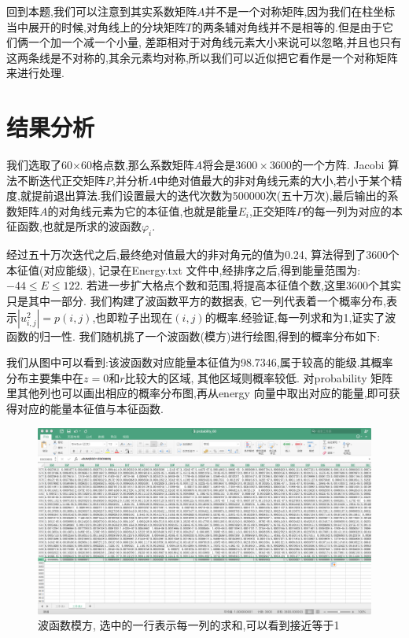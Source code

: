  回到本题,我们可以注意到其实系数矩阵$A$并不是一个对称矩阵,因为我们在柱坐标当中展开的时候,对角线上的分块矩阵$T$的两条辅对角线并不是相等的.但是由于它们俩一个加一个减一个小量, 差距相对于对角线元素大小来说可以忽略,并且也只有这两条线是不对称的,其余元素均对称,所以我们可以近似把它看作是一个对称矩阵来进行处理.
 
 \section{结果分析}
 
 我们选取了60$\times$60格点数,那么系数矩阵$A$将会是$3600\times 3600$的一个方阵. Jacobi 算法不断迭代正交矩阵$P$,并分析$A$中绝对值最大的非对角线元素的大小,若小于某个精度,就提前退出算法.我们设置最大的迭代次数为500000次(五十万次),最后输出的系数矩阵$A$的对角线元素为它的本征值,也就是能量$E_i$,正交矩阵$P$的每一列为对应的本征函数,也就是所求的波函数$\varphi_i$.
 
 经过五十万次迭代之后,最终绝对值最大的非对角元的值为0.24, 算法得到了3600个本征值(对应能级), 记录在Energy.txt 文件中,经排序之后,得到能量范围为:
$-44\leq E\leq 122$. 若进一步扩大格点个数和范围,将提高本征值个数,这里3600个其实只是其中一部分. 我们构建了波函数平方的数据表, 它一列代表着一个概率分布,表示$|u_{i,j}^2|=p(i,j)$,也即粒子出现在$(i,j)$的概率.经验证,每一列求和为1,证实了波函数的归一性. 我们随机挑了一个波函数(模方)进行绘图,得到的概率分布如下:

我们从图中可以看到:该波函数对应能量本征值为98.7346,属于较高的能级.其概率分布主要集中在$z=0$和$r$比较大的区域, 其他区域则概率较低. 对probability 矩阵里其他列也可以画出相应的概率分布图,再从energy 向量中取出对应的能量,即可获得对应的能量本征值与本征函数.
 
 \begin{figure}[htp]
    \centering
    \includegraphics[scale =0.30]{pic/5.png}
    \caption{波函数模方, 选中的一行表示每一列的求和,可以看到接近等于1}
\end{figure}
 
